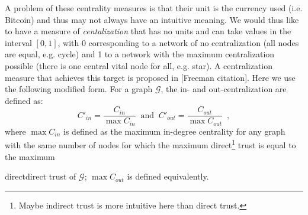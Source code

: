     A problem of these centrality measures is that their unit is the currency used (i.e. Bitcoin) and thus may not always have
    an intuitive meaning. We would thus like to have a measure of \textit{centalization} that has no units and can take values
    in the interval $\left[0,1\right]$, with 0 corresponding to a network of no centralization (all nodes are equal, e.g.
    cycle) and 1 to a network with the maximum centralization possible (there is one central vital node for all, e.g. star). A
    centralization measure that achieves this target is proposed in [Freeman citation]. Here we use the following modified
    form. For a graph $\mathcal{G}$, the in- and out-centralization are defined as:
    \begin{equation*}
      C'_{in} = \frac{C_{in}}{\max C_{in}} \: \mbox{ and } \: C'_{out} = \frac{C_{out}}{\max C_{out}} \enspace,
    \end{equation*}
    where $\max C_{in}$ is defined as the maximum in-degree centrality for any graph with the same number of nodes for which
    the maximum direct\footnote{Maybe indirect trust is more intuitive here than direct trust.} trust is equal to the maximum
    \addtocounter{footnote}{-1} direct\footnotemark direct trust of $\mathcal{G}$; $\max C_{out}$ is defined equivalently.

    \noindent\hrulefill
    \newpage
